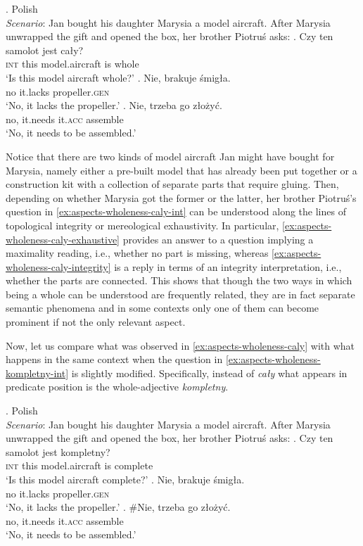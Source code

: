 \ex. Polish\\
\textit{Scenario}: Jan bought his daughter Marysia a model aircraft. After Marysia unwrapped the gift and opened the box, her brother Piotruś asks:\label{ex:aspects-wholeness-caly}
\ag. Czy ten samolot jest cały?\label{ex:aspects-wholeness-caly-int}\\
\textsc{int} this model.aircraft is whole\\
`Is this model aircraft whole?'
\bg. Nie, brakuje śmigła.\label{ex:aspects-wholeness-caly-exhaustive}\\
no it.lacks propeller\textsc{.gen}\\
`No, it lacks the propeller.'
\bg. Nie, trzeba go złożyć.\label{ex:aspects-wholeness-caly-integrity}\\
no, it.needs it\textsc{.acc} assemble\\
`No, it needs to be assembled.'

Notice that there are two kinds of model aircraft Jan might have bought for Marysia, namely either a pre-built model that has already been put together or a construction kit with a collection of separate parts that require gluing. Then, depending on whether Marysia got the former or the latter, her brother Piotruś's question in \ref{ex:aspects-wholeness-caly-int} can be understood along the lines of topological integrity or mereological exhaustivity. In particular, \ref{ex:aspects-wholeness-caly-exhaustive} provides an answer to a question implying a maximality reading, i.e., whether no part is missing, whereas \ref{ex:aspects-wholeness-caly-integrity} is a reply in terms of an integrity interpretation, i.e., whether the parts are connected. This shows that though the two ways in which being a whole can be understood are frequently related, they are in fact separate semantic phenomena and in some contexts only one of them can become prominent if not the only relevant aspect.

Now, let us compare what was observed in \ref{ex:aspects-wholeness-caly} with what happens in the same context when the question in \ref{ex:aspects-wholeness-kompletny-int} is slightly modified. Specifically, instead of \textit{cały} what appears in predicate position is the whole-adjective \textit{kompletny}. 

\ex. Polish\\
\textit{Scenario}: Jan bought his daughter Marysia a model aircraft. After Marysia unwrapped the gift and opened the box, her brother Piotruś asks:\label{ex:aspects-wholeness-kompletny}
\ag. Czy ten samolot jest kompletny?\label{ex:aspects-wholeness-kompletny-int}\\
\textsc{int} this model.aircraft is complete\\
`Is this model aircraft complete?'
\bg. Nie, brakuje śmigła.\label{ex:aspects-wholeness-kompletny-exhaustive}\\
no it.lacks propeller\textsc{.gen}\\
`No, it lacks the propeller.'
\bg. \#Nie, trzeba go złożyć.\label{ex:aspects-wholeness-kompletny-integrity}\\
no, it.needs it\textsc{.acc} assemble\\
`No, it needs to be assembled.'

